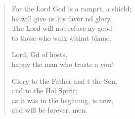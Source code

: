 \begin{verse}
\begin{patverse}
For the Lord God is a ramprt, a shield;\Med\\
he will give us his favor nd glory.\\
The Lord will not refuse ny good\Med\\
to those who walk withut blame.

Lord, Gd of hosts,\Med\\
happy the man who trusts \pointup{\i}n you!

Glory to the Father and t the Son,\Med\\
and to the Hol Spirit:\\
as it was in the beginn\pointup{\i}ng, is now,\Med\\
and will be forever. men. 
  \end{patverse}
\end{verse}
